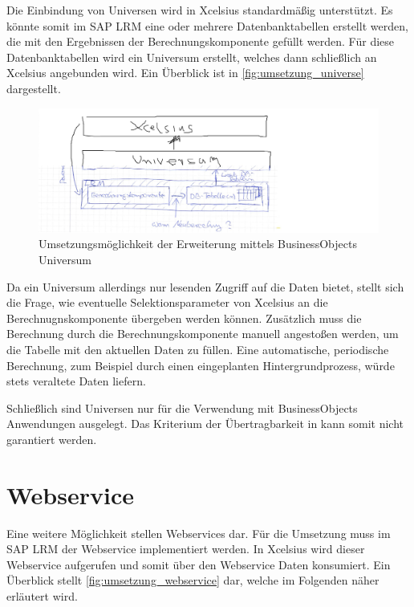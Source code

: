 \begin{onehalfspacing}
Die Einbindung von Universen wird in \gls{Xcelsius} standardmäßig unterstützt. Es könnte somit im SAP LRM eine oder mehrere Datenbanktabellen erstellt werden, die mit den Ergebnissen der Berechnungskomponente gefüllt werden. Für diese Datenbanktabellen wird ein Universum erstellt, welches dann schließlich an \gls{Xcelsius} angebunden wird. Ein Überblick ist in \vref{fig:umsetzung_universe} dargestellt.

\begin{figure}[h]
\centering
\setlength{\unitlength}{1mm}
\includegraphics[width=15cm]{images/umsetzung_universe.jpg}
\caption{Umsetzungsmöglichkeit der Erweiterung mittels BusinessObjects Universum \label{fig:umsetzung_universe}}
\end{figure} 

Da ein Universum allerdings nur lesenden Zugriff auf die Daten bietet, stellt sich die Frage, wie eventuelle Selektionsparameter von \gls{Xcelsius} an die Berechnugnskomponente übergeben werden können. Zusätzlich muss die Berechnung durch die Berechnungskomponente manuell angestoßen werden, um die Tabelle mit den aktuellen Daten zu füllen. Eine automatische, periodische Berechnung, zum Beispiel durch einen eingeplanten Hintergrundprozess, würde stets veraltete Daten liefern.

Schließlich sind Universen nur für die Verwendung mit BusinessObjects Anwendungen ausgelegt. Das Kriterium der Übertragbarkeit in  kann somit nicht garantiert werden.

\section{Webservice}
Eine weitere Möglichkeit stellen Webservices dar. Für die Umsetzung muss im SAP LRM der Webservice implementiert werden. In \gls{Xcelsius} wird dieser Webservice aufgerufen und somit über den Webservice Daten konsumiert. Ein Überblick stellt \vref{fig:umsetzung_webservice} dar, welche im Folgenden näher erläutert wird.


\end{onehalfspacing}
